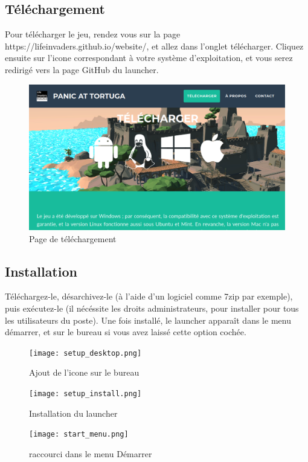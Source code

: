 \subsection{Téléchargement}

    Pour télécharger le jeu, rendez vous sur la page https://lifeinvaders.github.io/website/, 
    et allez dans l'onglet télécharger. Cliquez ensuite sur l'icone correspondant à votre 
    système d'exploitation, et vous serez redirigé vers la page GitHub du launcher. 
    
    \begin{figure}[hbt!]
        \centering
        \includegraphics[scale=0.4]{img/dl_page.png}
        \caption{Page de téléchargement}
    \end{figure}
    \FloatBarrier
    

\subsection{Installation}

    Téléchargez-le, désarchivez-le 
    (à l'aide d'un logiciel comme 7zip par exemple), puis exécutez-le (il nécéssite les droits administrateurs, pour 
    installer pour tous les utilisateurs du poste). Une fois installé, le launcher apparaît dans le menu démarrer, et 
    sur le bureau si vous avez laissé cette option cochée.

    \begin{figure}[hbt!]
        \centering
        \texttt{[image: setup\_desktop.png]}
        \caption{Ajout de l'icone sur le bureau}
    \end{figure}
    \FloatBarrier

    \begin{figure}[hbt!]
        \centering
        \texttt{[image: setup\_install.png]}
        \caption{Installation du launcher}
    \end{figure}
    \FloatBarrier

    \begin{figure}[hbt!]
        \centering
        \texttt{[image: start\_menu.png]}
        \caption{raccourci dans le menu Démarrer}
    \end{figure}
    \FloatBarrier

